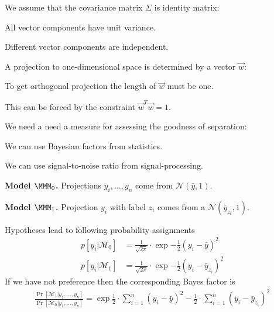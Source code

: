 \documentclass[landscape,footrule]{foils}
\begin{document}


We assume that the covariance matrix $\Sigma$ is identity matrix: 
\begin{triangles}
\item All vector components have unit variance. 
\item Different vector components are independent.
\end{triangles}



A projection to one-dimensional space is determined by a vector $\vec{w}$:
\begin{triangles}
\item To get orthogonal projection the length of $\vec{w}$ must be one.
\item This can be forced by the constraint $\vec{w}^T\vec{w}=1$.  
\end{triangles}



We need a need a  measure for assessing the goodness of separation: 
\begin{triangles}
\item We can use Bayesian factors from statistics.
\item We can use signal-to-noise ratio from signal-processing.
\end{triangles}


\begin{triangles}
\item \textbf{Model $\MMM_0$.} Projections $y_i,\ldots, y_n$ come from $\mathcal{N}(\bar{y}, 1)$.
\item \textbf{Model $\MMM_1$.} Projection $y_i$ with label $z_i$ comes from a $\mathcal{N}(\bar{y}_{z_i},1)$.\vspace*{2ex}
\end{triangles}

Hypotheses lead to following probability assignments
\begin{align*}
p[y_i|\mathcal{M}_0]&=\frac{1}{\sqrt{2\pi}}\cdot \exp{-\frac{1}{2}(y_i-\bar{y})^2}\\
p[y_i|\mathcal{M}_1]&=\frac{1}{\sqrt{2\pi}}\cdot \exp{-\frac{1}{2}(y_i-\bar{y}_{z_i})^2}
\end{align*}
If we have not preference then the corresponding Bayes factor is
\begin{align*}
\frac{\Pr[\mathcal{M}_1|y_1,\ldots,y_n]}{\Pr[\mathcal{M}_0|y_1,\ldots,y_n]}= 
\exp{\frac{1}{2}\cdot\sum_{i=1}^n(y_i-\bar{y})^2-\frac{1}{2}\cdot\sum_{i=1}^n(y_i-\bar{y}_{z_i})^2}
\end{align*}
\end{document}
